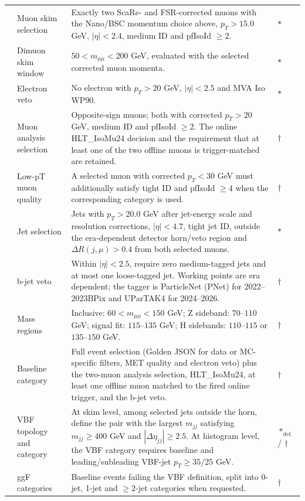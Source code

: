 \begin{longtable}{>{\centering\arraybackslash}p{} >{\raggedright\arraybackslash}p{} >{\raggedright\arraybackslash}p{} >{\centering\arraybackslash}p{}}
7 & Muon skim selection & Exactly two ScaRe- and FSR-corrected muons with the Nano/BSC momentum choice above, $p_T>15.0$ GeV, $|\eta|<2.4$, medium ID and pfIsoId $\geq2$. & $\ast$ \\
8 & Dimuon skim window & $50<m_{\mu\mu}<200$ GeV, evaluated with the selected corrected muon momenta. & $\ast$ \\
9 & Electron veto & No electron with $p_T>20$ GeV, $|\eta|<2.5$ and MVA Iso WP90. & $\ast$ \\
10 & Muon analysis selection & Opposite-sign muons; both with corrected $p_T>20$ GeV, medium ID and pfIsoId $\geq2$. The online HLT\_IsoMu24 decision and the requirement that at least one of the two offline muons is trigger-matched are retained. & $\dagger$ \\
11 & Low-pT muon quality & A selected muon with corrected $p_T<30$ GeV must additionally satisfy tight ID and pfIsoId $\geq4$ when the corresponding category is used. & $\dagger$ \\
12 & Jet selection & Jets with $p_T>20.0$ GeV after jet-energy scale and resolution corrections, $|\eta|<4.7$, tight jet ID, outside the era-dependent detector horn/veto region and $\Delta R(j,\mu)>0.4$ from both selected muons. & $\ast$ \\
13 & b-jet veto & Within $|\eta|<2.5$, require zero medium-tagged jets and at most one loose-tagged jet. Working points are era dependent; the tagger is ParticleNet (PNet) for 2022--2023BPix and UParTAK4 for 2024--2026. & $\dagger$ \\
14 & Mass regions & Inclusive: $60<m_{\mu\mu}<150$ GeV; Z sideband: $70$--$110$ GeV; signal fit: $115$--$135$ GeV; H sidebands: $110$--$115$ or $135$--$150$ GeV. & $\dagger$ \\
15 & Baseline category & Full event selection (Golden JSON for data or MC-specific filters, MET quality and electron veto) plus the two-muon analysis selection, HLT\_IsoMu24, at least one offline muon matched to the fired online trigger, and the b-jet veto. & $\dagger$ \\
16 & VBF topology and category & At skim level, among selected jets outside the horn, define the pair with the largest $m_{jj}$ satisfying $m_{jj}\geq400$ GeV and $|\Delta\eta_{jj}|\geq2.5$. At histogram level, the VBF category requires baseline and leading/subleading VBF-jet $p_T\geq35/25$ GeV. & $\ast_{\mathrm{def.}}$ / $\dagger$ \\
17 & ggF categories & Baseline events failing the VBF definition, split into 0-jet, 1-jet and $\geq2$-jet categories when requested. & $\dagger$ \\
\end{longtable}

